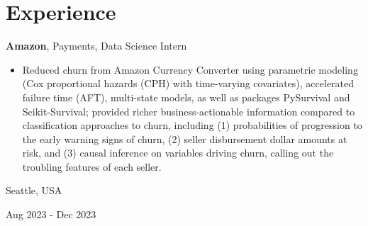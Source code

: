 \documentclass[10pt, letterpaper]{article}
\newenvironment{highlights}{
    \begin{itemize}[
        topsep=0.10 cm,
        parsep=0.10 cm,
        partopsep=0pt,
        itemsep=0pt,
        leftmargin=0.4 cm + 10pt
    ]
}{
    \end{itemize}
} %
\newenvironment{twocolentry}[2][]{
    \onecolentry
    \def\secondColumn{#2}
    \setcolumnwidth{\fill, 4.08 cm}
    \begin{paracol}{2}
}{
    \switchcolumn \raggedleft \secondColumn
    \end{paracol}
    \endonecolentry
} %
\begin{document}
    \section{Experience}





        \begin{twocolentry}{
            Seattle, USA

        Aug 2023 - Dec 2023

        }
        \textbf{Amazon}, Payments, Data Science Intern
            \begin{highlights}
                \item Reduced churn from Amazon Currency Converter using parametric modeling (Cox proportional hazards (CPH) with time-varying covariates), accelerated failure time (AFT), multi-state models, as well as packages PySurvival and Scikit-Survival; provided richer business-actionable information compared to classification approaches to churn, including (1) probabilities of progression to the early warning signs of churn, (2) seller disbursement dollar amounts at risk, and (3) causal inference on variables driving churn, calling out the troubling features of each seller.

            \end{highlights}
        \end{twocolentry}

        \vspace{0.2 cm}
\end{document}
